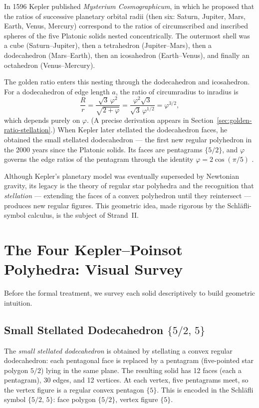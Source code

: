 In 1596 Kepler published \emph{Mysterium Cosmographicum}, in
which he proposed that the ratios of successive planetary
orbital radii (then six: Saturn, Jupiter, Mars, Earth, Venus,
Mercury) correspond to the ratios of circumscribed and
inscribed spheres of the five Platonic solids nested
concentrically.  The outermost shell was a cube (Saturn–Jupiter),
then a tetrahedron (Jupiter–Mars), then a dodecahedron
(Mars–Earth), then an icosahedron (Earth–Venus), and finally an
octahedron (Venus–Mercury).

The golden ratio enters this nesting through the dodecahedron
and icosahedron.  For a dodecahedron of edge length $a$, the
ratio of circumradius to inradius is
\[
  \frac{R}{r} = \frac{\sqrt{3}\,\varphi^2}{\sqrt{2+\varphi}}
    = \frac{\varphi^2\sqrt{3}}{\sqrt{3}\,\varphi^{1/2}}
    = \varphi^{3/2},
\]
which depends purely on \(\varphi\).  (A precise derivation
appears in Section~\ref{sec:golden-ratio-stellation}.)  When
Kepler later stellated the dodecahedron faces, he obtained the
small stellated dodecahedron — the first new regular polyhedron
in the 2000 years since the Platonic solids.  Its faces are
pentagrams \(\{5/2\}\), and \(\varphi\) governs the edge
ratios of the pentagram through the identity
\(\varphi = 2\cos(\pi/5)\) \cite{coxeter_regular_polytopes}.

Although Kepler's planetary model was eventually superseded by
Newtonian gravity, its legacy is the theory of regular star
polyhedra and the recognition that \emph{stellation} —
extending the faces of a convex polyhedron until they
reintersect — produces new regular figures.  This geometric
idea, made rigorous by the Schläfli-symbol calculus, is the
subject of Strand~II.

\section{The Four Kepler–Poinsot Polyhedra: Visual Survey}
\label{sec:visual-survey}

Before the formal treatment, we survey each solid descriptively
to build geometric intuition.

\subsection{Small Stellated Dodecahedron \texorpdfstring{$\{5/2,\,5\}$}{5/2,5}}
\label{ssec:small-stellated-dodecahedron}

The \emph{small stellated dodecahedron} is obtained by
stellating a convex regular dodecahedron: each pentagonal face
is replaced by a pentagram (five-pointed star polygon \(5/2\))
lying in the same plane.  The resulting solid has 12 faces
(each a pentagram), 30 edges, and 12 vertices.  At each vertex,
five pentagrams meet, so the vertex figure is a regular convex
pentagon \(\{5\}\).  This is encoded in the Schläfli symbol
\(\{5/2,\,5\}\): face polygon \(\{5/2\}\), vertex figure
\(\{5\}\).

